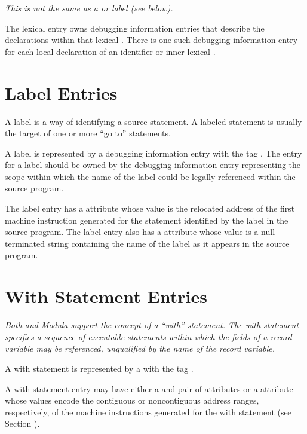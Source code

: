 \textit{This is not the same as a  or 
 label (see below).}

The lexical  entry owns 
debugging information entries that
describe the declarations within that lexical . 
There is
one such debugging information entry for each local declaration
of an identifier or inner lexical .

\section{Label Entries}
\label{chap:labelentries}

A label is a way of identifying a source statement. A labeled
statement is usually the target of one or more ``go to''
statements.

A label is represented by a debugging information entry with
the 
tag . 
The entry for a label should be owned by
the debugging information entry representing the scope within
which the name of the label could be legally referenced within
the source program.

The label entry has a  attribute whose value
is the relocated address of the first machine instruction
generated for the statement identified by the label in
the source program.  The label entry also has a 
attribute whose value is a null-terminated string containing
the name of the label as it appears in the source program.


\section{With Statement Entries}
\label{chap:withstatemententries}

\textit{Both  and 
Modula support the concept of a ``with''
statement. The with statement specifies a sequence of
executable statements within which the fields of a record
variable may be referenced, unqualified by the name of the
record variable.}

A with statement is represented by a
with the tag .

A with statement entry may have either a 
 and
 pair of attributes 
or 
a  attribute
whose values encode the contiguous or non\dash contiguous address
ranges, respectively, of the machine instructions generated
for the with statement 
(see Section ).

